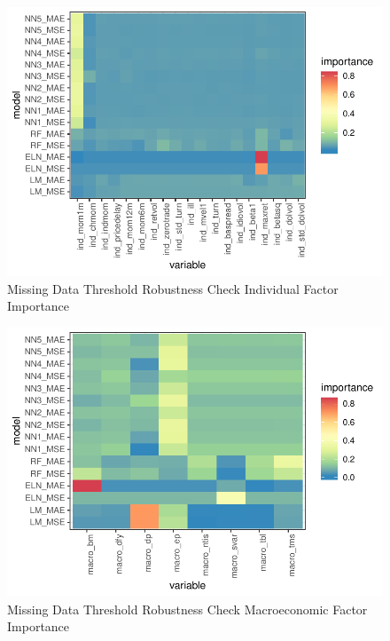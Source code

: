 \documentclass{article}
\begin{document}

\begin{figure}
	\includegraphics[]{../../Results/empirical_missing_threshold/empirical_all_sample_vi_ind.pdf}
	\caption{Missing Data Threshold Robustness Check Individual Factor Importance}
\end{figure}

\begin{figure}
	\includegraphics[]{../../Results/empirical_missing_threshold/empirical_sample_all_vi_macro.pdf}
	\caption{Missing Data Threshold Robustness Check Macroeconomic Factor Importance}
\end{figure}

\end{document}
